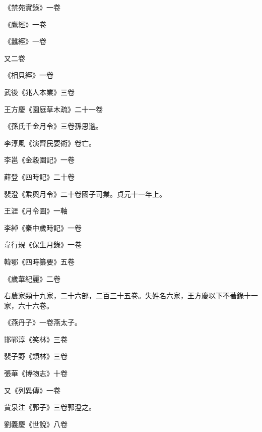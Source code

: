 \begin{pinyinscope}
 《禁苑實錄》一卷



 《鷹經》一卷



 《蠶經》一卷



 又二卷



 《相貝經》一卷



 武後《兆人本業》三卷



 王方慶《園庭草木疏》二十一卷



 《孫氏千金月令》三卷孫思邈。



 李淳風《演齊民要術》卷亡。



 李邕《金穀園記》一卷



 薛登《四時記》二十卷



 裴澄《乘輿月令》二十卷國子司業。貞元十一年上。



 王涯《月令圖》一軸



 李綽《秦中歲時記》一卷



 韋行規《保生月錄》一卷



 韓鄂《四時纂要》五卷



 《歲華紀麗》二卷



 右農家類十九家，二十六部，二百三十五卷。失姓名六家，王方慶以下不著錄十一家，六十六卷。



 《燕丹子》一卷燕太子。



 邯鄲淳《笑林》三卷



 裴子野《類林》三卷



 張華《博物志》十卷



 又《列異傳》一卷



 賈泉注《郭子》三卷郭澄之。



 劉義慶《世說》八卷




\end{pinyinscope}
